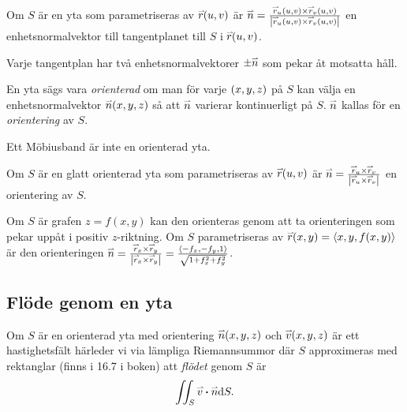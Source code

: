 \documentclass[a4paper]{article}
\begin{document}
\begin{påm}
    Om \(
        S
    \) är en yta som parametriseras av \(
        \accentset{\rightharpoonup}{r}(u,v)
    \) är \(
        \accentset{\rightharpoonup}{n} = \frac{\accentset{\rightharpoonup}{r}_u(u,v) \times \accentset{\rightharpoonup}{r}_v(u,v)}{\abs{\accentset{\rightharpoonup}{r}_u(u,v) \times \accentset{\rightharpoonup}{r}_v(u,v)}} 
    \) en enhetsnormalvektor till tangentplanet till \(
        S
    \) i \(
        \accentset{\rightharpoonup}{r}(u,v)
    \).
\end{påm}

Varje tangentplan har två enhetsnormalvektorer \(
    \pm \accentset{\rightharpoonup}{n}
\) som pekar åt motsatta håll. 
\begin{defn}
    En yta sägs vara \emph{orienterad} om man för varje \(
        (x,y,z)
    \) på \(
        S
    \) kan välja en enhetsnormalvektor \(
        \accentset{\rightharpoonup}{n}(x,y,z)
    \) så att \(
        \accentset{\rightharpoonup}{n}
    \) varierar kontinuerligt på \(
        S
    \). \(
        \accentset{\rightharpoonup}{n}
    \) kallas för en \emph{orientering} av \(
        S
    \).
\end{defn}

\begin{ex}
    Ett Möbiusband är inte en orienterad yta.
\end{ex}

\begin{sats}
    Om \(
        S
    \) är en glatt orienterad yta som parametriseras av \(
        \accentset{\rightharpoonup}{r}(u,v)
    \) är \(
        \accentset{\rightharpoonup}{n} = \frac{\accentset{\rightharpoonup}{r}_u \times \accentset{\rightharpoonup}{r}_v}{\abs{\accentset{\rightharpoonup}{r}_u\times\accentset{\rightharpoonup}{r}_v}} 
    \) en orientering av \(
        S
    \).
\end{sats}

Om \(
    S
\) är grafen \(
    z = f(x,y)
\) kan den orienteras genom att ta orienteringen som pekar uppåt i positiv \(
    z
\)-riktning. Om \(
    S
\) parametriseras av \(
    \accentset{\rightharpoonup}{r}(x,y) = \left\langle x,y,f(x,y)\right\rangle
\) är den orienteringen \(
    \accentset{\rightharpoonup}{n} = \frac{\accentset{\rightharpoonup}{r}_x\times\accentset{\rightharpoonup}{r}_y}{\abs{\accentset{\rightharpoonup}{r}_x\times\accentset{\rightharpoonup}{r}_y}} 
        = \frac{\left\langle -f_x, -f_y, 1\right\rangle}{\sqrt{1 + f_x^2 +f_y^2}}
\).

\subsection{Flöde genom en yta}
\begin{sats}
    Om \(
        S
    \) är en orienterad yta med orientering \(
        \accentset{\rightharpoonup}{n}(x,y,z)
    \) och \(
        \accentset{\rightharpoonup}{v}(x,y,z)
    \) är ett hastighetsfält härleder vi via lämpliga Riemannsummor där \(
        S
    \) approximeras med rektanglar (finns i 16.7 i boken) att \emph{flödet} genom \(
        S
    \) är \[
        \iint_S \accentset{\rightharpoonup}{v} \boldsymbol{\cdot} \accentset{\rightharpoonup}{n} \dd S.
    \]
\end{sats}
\end{document}
